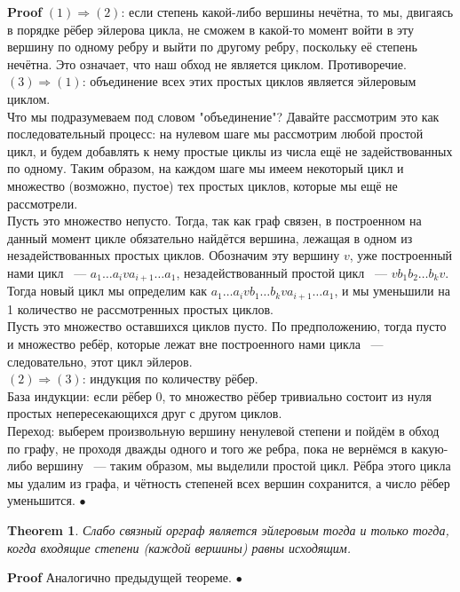 \documentclass[a4paper]{article}
\theoremstyle{plain}
\newtheorem{theorem}{Theorem}
\theoremstyle{remark}
\theoremstyle{definition}
\renewenvironment{proof}{{\bfseries Proof}}{$\bullet$}
\begin{document}
\begin{proof} $(1)\Rightarrow(2)$: если степень какой-либо вершины нечётна, то мы, двигаясь в порядке рёбер эйлерова цикла, не сможем в какой-то момент войти в эту вершину по одному ребру и выйти по другому ребру, поскольку её степень нечётна. Это означает, что наш обход не является циклом. Противоречие.\\
$(3)\Rightarrow(1)$: объединение всех этих простых циклов является эйлеровым циклом.\\
Что мы подразумеваем под словом "объединение"? Давайте рассмотрим это как последовательный процесс: на нулевом шаге мы рассмотрим любой простой цикл, и будем добавлять к нему простые циклы из числа ещё не задействованных по одному. Таким образом, на каждом шаге мы имеем некоторый цикл и множество (возможно, пустое) тех простых циклов, которые мы ещё не рассмотрели.\\
Пусть это множество непусто. Тогда, так как граф связен, в построенном на данный момент цикле обязательно найдётся вершина, лежащая в одном из незадействованных простых циклов. Обозначим эту вершину $v$, уже построенный нами цикл ~--- $a_1\dots a_i v a_{i+1}\dots a_1$, незадействованный простой цикл ~--- $vb_1b_2\dots b_kv$. Тогда новый цикл мы определим как $a_1\dots a_i v b_1\dots b_k v a_{i+1}\dots a_1$, и мы уменьшили на 1 количество не рассмотренных простых циклов.\\
Пусть это множество оставшихся циклов пусто. По предположению, тогда пусто и множество ребёр, которые лежат вне построенного нами цикла ~--- следовательно, этот цикл эйлеров.\\
$(2)\Rightarrow(3)$: индукция по количеству рёбер.\\
База индукции: если рёбер $0$, то множество рёбер тривиально состоит из нуля простых непересекающихся друг с другом циклов.\\
Переход: выберем произвольную вершину ненулевой степени и пойдём в обход по графу, не проходя дважды одного и того же ребра, пока не вернёмся в какую-либо вершину ~--- таким образом, мы выделили простой цикл. Рёбра этого цикла мы удалим из графа, и чётность степеней всех вершин сохранится, а число рёбер уменьшится.
\end{proof}
\begin{theorem} Слабо связный орграф является эйлеровым тогда и только тогда, когда входящие степени (каждой вершины) равны исходящим.
\end{theorem}
\begin{proof} Аналогично предыдущей теореме.
\end{proof}
\end{document}
